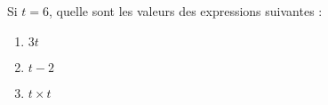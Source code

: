 
\begin{exercice}\label{exo2smath-0074}

    Si \( t=6\), quelle sont les valeurs des expressions suivantes :
    \begin{multicols}{3}
    \begin{enumerate}
        \item
            \( 3t\)
        \item
            \( t-2\)
        \item
            \( t\times t\)
    \end{enumerate}
    \end{multicols}


\end{exercice}
